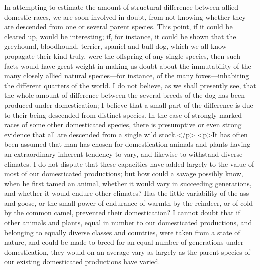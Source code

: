 In attempting to estimate the amount of structural difference
between allied domestic races, we are soon involved in doubt, from
not knowing whether they are descended from one or several parent
species. This point, if it could be cleared up, would be
interesting; if, for instance, it could be shown that the
greyhound, bloodhound, terrier, spaniel and bull-dog, which we all
know propagate their kind truly, were the offspring of any single
species, then such facts would have great weight in making us doubt
about the immutability of the many closely allied natural
species—for instance, of the many foxes—inhabiting the different
quarters of the world. I do not believe, as we shall presently see,
that the whole amount of difference between the several breeds of
the dog has been produced under domestication; I believe that a
small part of the difference is due to their being descended from
distinct species. In the case of strongly marked races of some
other domesticated species, there is presumptive or even strong
evidence that all are descended from a single wild stock.</p>
<p>It has often been assumed that man has chosen for domestication
animals and plants having an extraordinary inherent tendency to
vary, and likewise to withstand diverse climates. I do not dispute
that these capacities have added largely to the value of most of
our domesticated productions; but how could a savage possibly know,
when he first tamed an animal, whether it would vary in succeeding
generations, and whether it would endure other climates? Has the
little variability of the ass and goose, or the small power of
endurance of warmth by the reindeer, or of cold by the common
camel, prevented their domestication? I cannot doubt that if other
animals and plants, equal in number to our domesticated
productions, and belonging to equally diverse classes and
countries, were taken from a state of nature, and could be made to
breed for an equal number of generations under domestication, they
would on an average vary as largely as the parent species of our
existing domesticated productions have varied.

